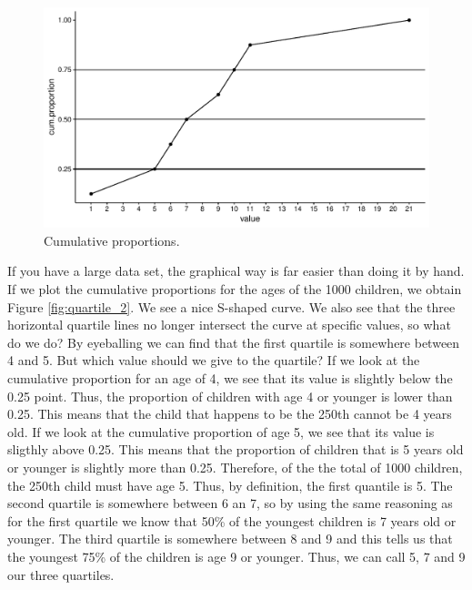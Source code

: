 \documentclass[]{book}\usepackage[]{graphicx}\usepackage[]{color}
\makeatletter
\def\maxwidth{ %
  \ifdim\Gin@nat@width>\linewidth
    \linewidth
  \else
    \Gin@nat@width
  \fi
}
\makeatother
\begin{document}
\begin{figure}

{\centering \includegraphics[width=\maxwidth]{figure/quartile_1-1} 

}

\caption[Cumulative proportions]{Cumulative proportions.}\label{fig:quartile_1}
\end{figure}



If you have a large data set, the graphical way is far easier than doing it by hand. If we plot the cumulative proportions for the ages of the 1000 children, we obtain Figure \ref{fig:quartile_2}. We see a nice S-shaped curve. We also see that the three horizontal quartile lines no longer intersect the curve at specific values, so what do we do? By eyeballing we can find that the first quartile is somewhere between 4 and 5. But which value should we give to the quartile? If we look at the cumulative proportion for an age of 4, we see that its value is slightly below the 0.25 point. Thus, the proportion of children with age 4 or younger is lower than 0.25. This means that the child that happens to be the 250th cannot be 4 years old. If we look at the cumulative proportion of age 5, we see that its value is sligthly above 0.25. This means that the proportion of children that is 5 years old or younger is slightly more than 0.25. Therefore, of the the total of 1000 children, the 250th child must have age 5. Thus, by definition, the first quantile is 5. 
The second quartile is somewhere between 6 an 7, so by using the same reasoning as for the first quartile we know that 50\% of the youngest children is 7 years old or younger. The third quartile is somewhere between 8 and 9 and this tells us that the youngest 75\% of the children is age 9 or younger. Thus, we can call 5, 7 and 9 our three quartiles.
\end{document}
